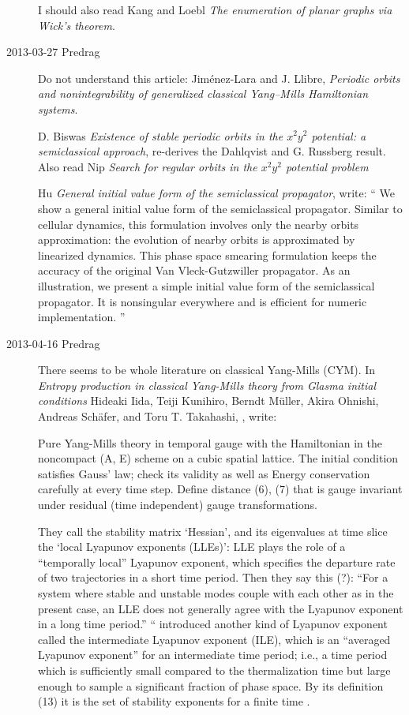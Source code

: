 \begin{description}
I should also read Kang and Loebl
{\em The enumeration of planar graphs via {Wick}'s theorem}.

\item[2013-03-27  Predrag] Do not understand this article:
Jim\'enez-Lara and J. Llibre,
{\em Periodic orbits and nonintegrability of generalized
classical {Yang--Mills Hamiltonian} systems}.

                                                \toCB
D. Biswas \etal{} {\em Existence of stable periodic orbits
in the $x^2y^2$ potential: a semiclassical approach}, re-derives the
Dahlqvist and G. Russberg result. Also read Nip
\etal{} {\em Search for regular orbits in the $x^2y^2$
potential problem}

Hu
{\em General initial value form of the semiclassical propagator},
write: ``
We show a general initial value form of the semiclassical propagator.
Similar to cellular dynamics, this formulation involves only the
nearby orbits approximation: the evolution of nearby orbits is
approximated by linearized dynamics. This phase space smearing
formulation keeps the accuracy of the original Van Vleck-Gutzwiller
propagator. As an illustration, we present a simple initial value
form of the semiclassical propagator. It is nonsingular everywhere
and is efficient for numeric implementation.
''

\item[2013-04-16  Predrag] There seems to be whole literature on
classical Yang-Mills (CYM). In
{\em Entropy production in classical Yang-Mills theory from Glasma
initial conditions} Hideaki Iida,  Teiji Kunihiro,  Berndt M\"uller,
Akira Ohnishi,  Andreas Sch\"afer,  and Toru T. Takahashi,
, %
write:

Pure Yang-Mills theory in temporal gauge with the Hamiltonian in the
noncompact (A, E) scheme on a cubic spatial lattice. The initial
condition satisfies Gauss' law; check its validity as well as Energy
conservation carefully at every time step. Define distance (6), (7) that
is gauge invariant under residual (time independent) gauge transformations.

                                                    \inCB
They call the stability matrix `Hessian', and its eigenvalues at time
slice the `local Lyapunov exponents (LLEs)': LLE plays the
role of a ``temporally local'' Lyapunov exponent, which specifies the
departure rate of two trajectories in a short time period. Then they say
this (?): ``For a system where stable and unstable modes couple with each
other as in the present case, an LLE does not generally agree with the
Lyapunov exponent in a long time period.'' `` introduced
another kind of Lyapunov exponent called the intermediate Lyapunov
exponent (ILE), which is an ``averaged Lyapunov exponent'' for an
intermediate time period; i.e., a time period which is sufficiently small
compared to the thermalization time but large enough to sample a
significant fraction of phase space. By its definition (13) it
is the set of stability exponents for a finite time \jacobianM.


\end{description}
